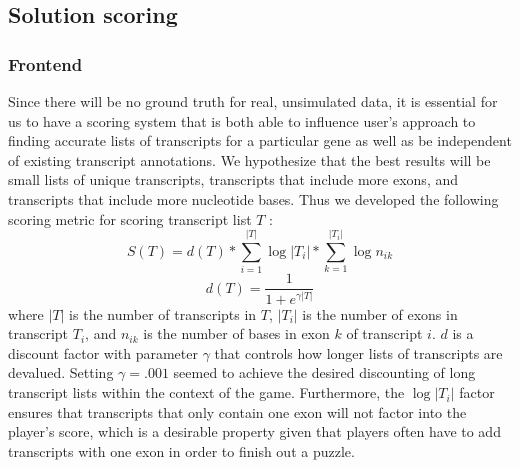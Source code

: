 \documentclass[12pt]{article}
\begin{document}
\subsection*{Solution scoring}
\label{sec:scoring}
\subsubsection*{Frontend}
Since there will be no ground truth for real, unsimulated data, it is essential for us to have
a scoring system that is both able to influence user's approach to finding accurate lists of transcripts for a particular gene as well as be independent of existing transcript annotations. We hypothesize that the best results will be small lists of unique transcripts, transcripts that include more exons, and transcripts that include more nucleotide bases.
Thus we developed the following scoring metric for scoring transcript list $T$ :
\begin{equation*}
S(T) = d(T) * \sum_{i=1}^{|T|} \log{|T_i|} * \sum_{k = 1}^{|T_i|} \log{n_{ik}}
\end{equation*}
\begin{equation*}
d(T) = \frac{1}{1+e^{\gamma |T|}}
\end{equation*}
where $|T|$ is the number of transcripts in $T$, $|T_i|$ is the number of exons in transcript $T_i$, and $n_{ik}$ is the number of bases in exon $k$ of transcript $i$.
$d$ is a discount factor with parameter $\gamma$ that controls how longer lists of transcripts are devalued. Setting $\gamma = .001$ seemed to achieve the desired
discounting of long transcript lists within the context of the game. Furthermore, the $\log{|T_i|}$ factor ensures that transcripts that only contain one exon will not factor
into the player's score, which is a desirable property given that players often have to add transcripts with one exon in order to finish out a puzzle.
\end{document}
